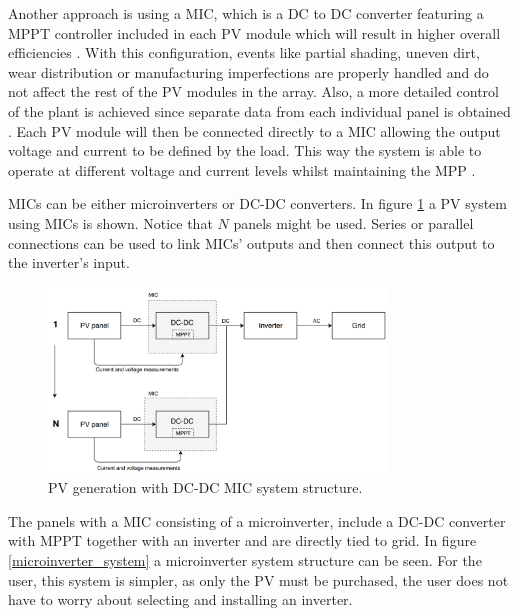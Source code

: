 Another approach is using a MIC, which is a DC to DC converter featuring a MPPT controller included in each PV module which will result in higher overall efficiencies \cite{ArchitectureMIC}. With this configuration, events like partial shading, uneven dirt, wear distribution or manufacturing imperfections are properly handled and do not affect the rest of the PV modules in the array. Also, a more detailed control of the plant is achieved since separate data from each individual panel is obtained \cite{ArchitectureMIC}. Each PV module will then be connected directly to a MIC allowing the output voltage and current to be defined by the load. This way the system is able to operate at different voltage and current levels whilst maintaining the MPP \cite{ArchitectureMIC}.

MICs can be either microinverters or DC-DC converters. In figure \ref{MIC_dcdc} a PV system using MICs is shown. Notice that $N$ panels might be used. Series or parallel connections can be used to link MICs' outputs and then connect this output to the inverter's input.

\begin{figure}[H]
	\begin{center}
		\includegraphics[width=0.8\textwidth]{../Pictures/MIC_dcdc}
		\caption{PV generation with DC-DC MIC system structure.}
		\label{MIC_dcdc}
	\end{center}	
\end{figure}

The panels with a MIC consisting of a microinverter, include a DC-DC converter with MPPT together with an inverter and are directly tied to grid. In figure \ref{microinverter_system} a microinverter system structure can be seen. For the user, this system is simpler, as only the PV must be purchased, the user does not have to worry about selecting and installing an inverter. 

